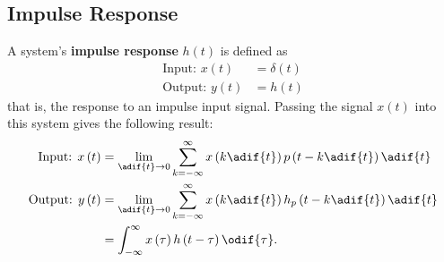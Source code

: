 \documentclass{article}
\begin{document}
\subsection{Impulse Response}
A system's \textbf{impulse response} \(h\left( t \right)\) is defined as
\begin{align*}
    \text{Input: } x\left( t \right)  & = \delta\left( t \right) \\
    \text{Output: } y\left( t \right) & = h\left( t \right)
\end{align*}
that is, the response to an impulse input signal.
Passing the signal \(x\left( t \right)\) into this system gives the following result:
\begin{align*}
    \text{Input: } x\left( t \right)  & = \lim_{\adif{t} \to 0} \sum_{k = -\infty}^\infty x\left( k \adif{t} \right) p\left( t - k \adif{t} \right) \adif{t}   \\
    \text{Output: } y\left( t \right) & = \lim_{\adif{t} \to 0} \sum_{k = -\infty}^\infty x\left( k \adif{t} \right) h_p\left( t - k \adif{t} \right) \adif{t} \\
                                      & = \int_{-\infty}^\infty x\left( \tau \right) h\left( t - \tau \right) \odif{\tau}.
\end{align*}
\end{document}
